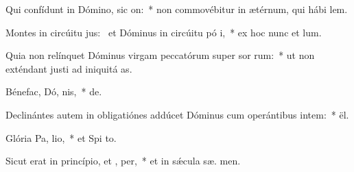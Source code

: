 \item Qui confídunt in Dómino, sic  on:~* non commovébitur in ætérnum, qui hábi  lem.
\item Montes in circúitu jus:~\pscross{} et Dóminus in circúitu pó i,~* ex hoc nunc et   lum.
\item Quia non relínquet Dóminus virgam peccatórum super sor rum:~* ut non exténdant justi ad iniquitá  as.
\item Bénefac, Dó, nis,~*   de.
\item Declinántes autem in obligatiónes addúcet Dóminus cum operántibus intem:~*   ël.
\item Glória Pa,  lio,~* et Spi to.
\item Sicut erat in princípio, et ,  per,~* et in sǽcula sæ. men.
